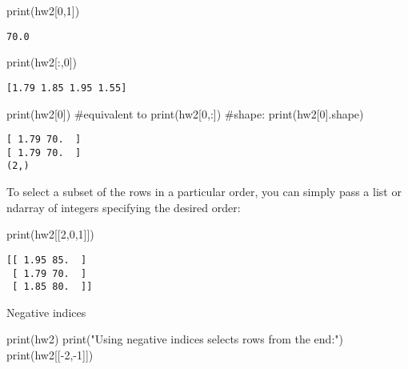 \documentclass[
  letterpaper,
  DIV=11,
  numbers=noendperiod]{scrreprt}
\newenvironment{Shaded}{\begin{snugshade}}{\end{snugshade}}
\newcommand{\BuiltInTok}[1]{\textcolor[rgb]{0.00,0.23,0.31}{#1}}
\newcommand{\CommentTok}[1]{\textcolor[rgb]{0.37,0.37,0.37}{#1}}
\newcommand{\DecValTok}[1]{\textcolor[rgb]{0.68,0.00,0.00}{#1}}
\newcommand{\NormalTok}[1]{\textcolor[rgb]{0.00,0.23,0.31}{#1}}
\newcommand{\OperatorTok}[1]{\textcolor[rgb]{0.37,0.37,0.37}{#1}}
\newcommand{\StringTok}[1]{\textcolor[rgb]{0.13,0.47,0.30}{#1}}
\begin{document}
\begin{Shaded}
\begin{Highlighting}[]
\BuiltInTok{print}\NormalTok{(hw2[}\DecValTok{0}\NormalTok{,}\DecValTok{1}\NormalTok{])}
\end{Highlighting}
\end{Shaded}

\begin{verbatim}
70.0
\end{verbatim}

\begin{Shaded}
\begin{Highlighting}[]
\BuiltInTok{print}\NormalTok{(hw2[:,}\DecValTok{0}\NormalTok{])}
\end{Highlighting}
\end{Shaded}

\begin{verbatim}
[1.79 1.85 1.95 1.55]
\end{verbatim}

\begin{Shaded}
\begin{Highlighting}[]
\BuiltInTok{print}\NormalTok{(hw2[}\DecValTok{0}\NormalTok{])}
\CommentTok{\#equivalent to}
\BuiltInTok{print}\NormalTok{(hw2[}\DecValTok{0}\NormalTok{,:])}
\CommentTok{\#shape:}
\BuiltInTok{print}\NormalTok{(hw2[}\DecValTok{0}\NormalTok{].shape)}
\end{Highlighting}
\end{Shaded}

\begin{verbatim}
[ 1.79 70.  ]
[ 1.79 70.  ]
(2,)
\end{verbatim}

To select a subset of the rows in a particular order, you can simply
pass a list or ndarray of integers specifying the desired order:

\begin{Shaded}
\begin{Highlighting}[]
\BuiltInTok{print}\NormalTok{(hw2[[}\DecValTok{2}\NormalTok{,}\DecValTok{0}\NormalTok{,}\DecValTok{1}\NormalTok{]])}
\end{Highlighting}
\end{Shaded}

\begin{verbatim}
[[ 1.95 85.  ]
 [ 1.79 70.  ]
 [ 1.85 80.  ]]
\end{verbatim}

Negative indices

\begin{Shaded}
\begin{Highlighting}[]
\BuiltInTok{print}\NormalTok{(hw2)}
\BuiltInTok{print}\NormalTok{(}\StringTok{"Using negative indices selects rows from the end:"}\NormalTok{)}
\BuiltInTok{print}\NormalTok{(hw2[[}\OperatorTok{{-}}\DecValTok{2}\NormalTok{,}\OperatorTok{{-}}\DecValTok{1}\NormalTok{]])}
\end{Highlighting}
\end{Shaded}
\end{document}
